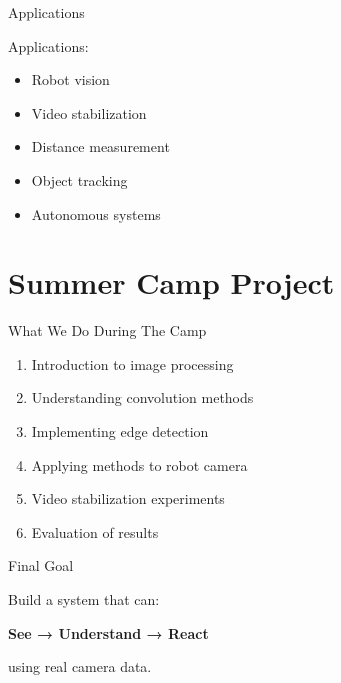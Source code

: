 \documentclass{beamer}
\begin{document}


\begin{frame}{Applications}


    Applications:

    \begin{itemize}

        \item Robot vision

        \item Video stabilization

        \item Distance measurement

        \item Object tracking

        \item Autonomous systems

    \end{itemize}


\end{frame}




\section{Summer Camp Project}


\begin{frame}{What We Do During The Camp}


    \begin{enumerate}

        \item Introduction to image processing

        \item Understanding convolution methods

        \item Implementing edge detection

        \item Applying methods to robot camera

        \item Video stabilization experiments

        \item Evaluation of results


    \end{enumerate}


\end{frame}





\begin{frame}{Final Goal}


    Build a system that can:


    \begin{center}

        \textbf{See → Understand → React}

    \end{center}


    using real camera data.


\end{frame}
\end{document}
